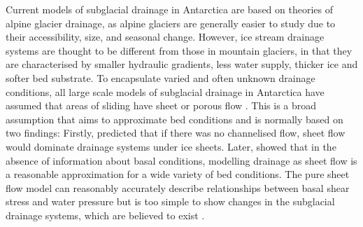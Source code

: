 Current  models of subglacial  drainage in Antarctica are based on theories of alpine glacier  drainage, as alpine glaciers are generally easier to study due to their accessibility, size, and seasonal change. However, ice stream drainage systems are thought to be different from those in mountain glaciers, in that they are characterised by smaller hydraulic gradients, less water supply, thicker ice and softer bed substrate.
To encapsulate varied and often unknown drainage conditions, all large scale models of subglacial drainage in Antarctica have assumed that areas of sliding have sheet or porous flow \citep{flowers2015modelling}. This is a broad assumption that aims to approximate bed conditions and is normally based on two findings: Firstly, \citet{alley1989water} predicted that if there was no channelised flow, sheet flow would dominate drainage systems under ice sheets. Later, \citet{alley1996towards} showed that in the absence of information about basal conditions, modelling drainage as sheet flow is a reasonable approximation for a wide variety of bed conditions. The \citet{alley1996towards} pure sheet flow model can reasonably accurately describe relationships between basal shear stress and water pressure but is too simple to show changes in the subglacial drainage systems, which are believed to exist \citep[e.g.][]{schroeder2013evidence}.

